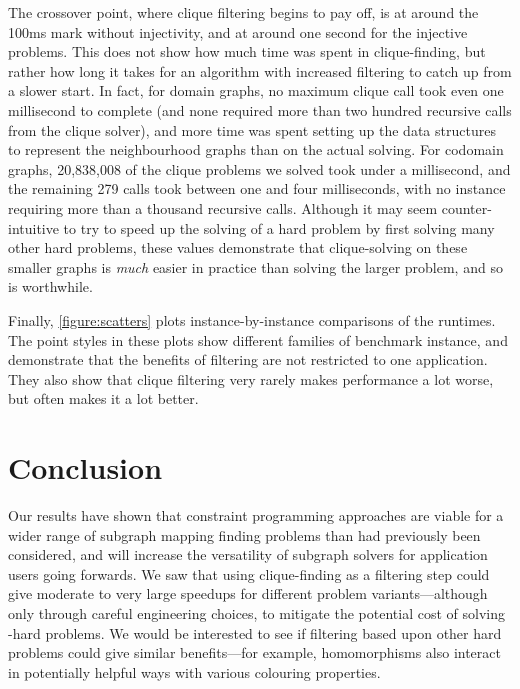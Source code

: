 \documentclass{article}
\begin{document}
The crossover point, where clique filtering begins to pay off, is at around the 100ms mark without
injectivity, and at around one second for the injective problems. This does not show how much time
was spent in clique-finding, but rather how long it takes for an algorithm with increased
filtering to catch up from a slower start. In fact, for domain graphs, no maximum clique call took
even one millisecond to complete (and none required more than two hundred recursive calls from the
clique solver), and more time was spent setting up the data structures to represent the
neighbourhood graphs than on the actual solving. For codomain graphs, 20,838,008 of the clique
problems we solved took under a millisecond, and the remaining 279 calls took between one and four
milliseconds, with no instance requiring more than a thousand recursive calls.  Although it may seem
counter-intuitive to try to speed up the solving of a hard problem by first solving many other hard
problems, these values demonstrate that clique-solving on these smaller graphs is \emph{much} easier
in practice than solving the larger problem, and so is worthwhile.

Finally, \cref{figure:scatters} plots instance-by-instance comparisons of the runtimes. The
point styles in these plots show different families of benchmark instance, and demonstrate
that the benefits of filtering are not restricted to one application. They also show that clique
filtering very rarely makes performance a lot worse, but often makes it a lot better.

\section{Conclusion}

Our results have shown that constraint programming approaches are viable for a wider range of subgraph
mapping finding problems than had previously been considered, and will increase the versatility of
subgraph solvers for application users going forwards. We saw that using clique-finding as a
filtering step could give moderate to very large speedups for different problem variants---although
only through careful engineering choices, to mitigate the potential cost of solving \NP-hard
problems. We would be interested to see if filtering based upon other hard problems could give
similar benefits---for example, homomorphisms also interact in potentially helpful ways with various
colouring properties.



\end{document}
